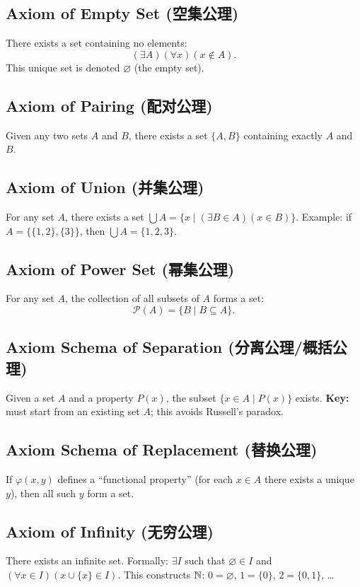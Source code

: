 \documentclass{article}
\begin{document}
\subsection{Axiom of Empty Set (空集公理)}\label{def:empty-set}
There exists a set containing no elements:
\[
  (\exists A)(\forall x)(x \notin A).
\]
This unique set is denoted $\varnothing$ (the empty set).

\subsection{Axiom of Pairing (配对公理)}\label{def:pairing}
Given any two sets $A$ and $B$, there exists a set $\{A, B\}$
containing exactly $A$ and $B$.

\subsection{Axiom of Union (并集公理)}\label{def:union-axiom}
For any set $A$, there exists a set $\bigcup A = \{x \mid (\exists B
\in A)(x \in B)\}$.
Example: if $A = \{\{1,2\}, \{3\}\}$, then $\bigcup A = \{1, 2, 3\}$.

\subsection{Axiom of Power Set (幂集公理)}\label{def:power-set-axiom}
For any set $A$, the collection of all subsets of $A$ forms a set:
\[
  \mathcal{P}(A) = \{B \mid B \subseteq A\}.
\]

\subsection{Axiom Schema of Separation (分离公理/概括公理)}\label{def:separation}
Given a set $A$ and a property $P(x)$, the subset $\{x \in A \mid
P(x)\}$ exists.
\textbf{Key:} must start from an existing set $A$; this avoids
Russell's paradox.

\subsection{Axiom Schema of Replacement (替换公理)}\label{def:replacement}
If $\varphi(x, y)$ defines a ``functional property'' (for each $x \in
A$ there exists a unique $y$), then all such $y$ form a set.

\subsection{Axiom of Infinity (无穷公理)}\label{def:infinity}
There exists an infinite set. Formally: $\exists I$ such that
$\varnothing \in I$ and $(\forall x \in I)(x \cup \{x\} \in I)$.
This constructs $\mathbb{N}$: $0 = \varnothing$, $1 = \{0\}$, $2 = \{0, 1\}$, \ldots
\end{document}
